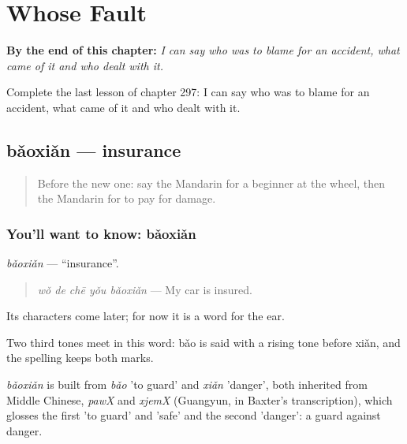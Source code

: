 
\chapter{Whose Fault}
\label{ch:zh-whose-fault}

\begin{chapteropening}
\textbf{By the end of this chapter:} \emph{I can say who was to blame for an accident, what came of it and who dealt with it.}

Complete the last lesson of chapter 297: I can say who was to blame for an accident, what came of it and who dealt with it.
\end{chapteropening}

\section[bǎoxiǎn]{bǎoxiǎn — insurance}

\label{lesson:ZH-C297-baoxian}



\begin{quote}
Before the new one: say the Mandarin for a beginner at the wheel, then the Mandarin for to pay for damage.
\end{quote}

\subsection*{You'll want to know: bǎoxiǎn}
\emph{bǎoxiǎn} — \textquotedblleft{}insurance\textquotedblright{}.

\begin{quote}
\emph{wǒ de chē yǒu bǎoxiǎn} — My car is insured.
\end{quote}

Its characters come later; for now it is a word for the ear.

Two third tones meet in this word: bǎo is said with a rising tone before xiǎn, and the spelling keeps both marks.

\begin{cousinweb}
\emph{bǎoxiǎn} is built from \emph{bǎo} 'to guard' and \emph{xiǎn} 'danger', both inherited from Middle Chinese, \emph{pawX} and \emph{xjemX} (Guangyun, in Baxter's transcription), which glosses the first 'to guard' and 'safe' and the second 'danger': a guard against danger.
\end{cousinweb}

